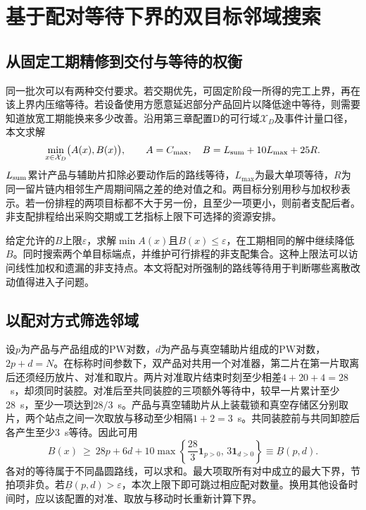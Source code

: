 \section{基于配对等待下界的双目标邻域搜索}\label{sec:third-innovation}

\subsection{从固定工期精修到交付与等待的权衡}

同一批次可以有两种交付要求。若交期优先，可固定阶段一所得的完工上界，再在该上界内压缩等待。若设备使用方愿意延迟部分产品回片以降低途中等待，则需要知道放宽工期能换来多少改善。沿用第三章配置D的可行域$\mathcal X_D$及事件计量口径，本文求解
\begin{equation}
 \min_{x\in\mathcal X_D}\bigl(A(x),B(x)\bigr),\qquad
 A=C_{\max},\quad B=L_{\rm sum}+10L_{\max}+25R .
 \label{eq:pareto-ab}
\end{equation}
$L_{\rm sum}$累计产品与辅助片扣除必要动作后的路线等待，$L_{\max}$为最大单项等待，$R$为同一留片链内相邻生产周期间隔之差的绝对值之和。两目标分别用秒与加权秒表示。若一份排程的两项目标都不大于另一份，且至少一项更小，则前者支配后者。非支配排程给出采购交期或工艺指标上限下可选择的资源安排。\par

给定允许的$B$上限$\varepsilon$，求解$\min A(x)$且$B(x)\le\varepsilon$，在工期相同的解中继续降低$B$。同时搜索两个单目标端点，并维护可行排程的非支配集合。这种上限法可以访问线性加权和遗漏的非支持点\citep{mavrotas2009}。本文将配对所强制的路线等待用于判断哪些离散改动值得进入子问题。

\subsection{以配对方式筛选邻域}

设$p$为产品与产品组成的PW对数，$d$为产品与真空辅助片组成的PW对数，$2p+d=N$。在标称时间参数下，双产品对共用一个对准器，第二片在第一片取离后还须经历放片、对准和取片。两片对准取片结束时刻至少相差$4+20+4=28$~s，却须同时装腔。对准后至共同装腔的三项额外等待中，较早一片累计至少28~s，至少一项达到$28/3$~s。产品与真空辅助片从上装载锁和真空存储区分别取片，两个站点之间一次取放与移动至少相隔$1+2=3$~s。共同装腔前与共同卸腔后各产生至少3~s等待。因此可用
\begin{equation}
 B(x)\ \ge\ 28p+6d+
 10\max\!\left\{\frac{28}{3}\mathbf{1}_{p>0},\,3\mathbf{1}_{d>0}\right\}
 \equiv \underline B(p,d).
 \label{eq:pareto-pair-bound}
\end{equation}
各对的等待属于不同晶圆路线，可以求和。最大项取所有对中成立的最大下界，节拍项非负。若$\underline B(p,d)>\varepsilon$，本次上限下即可跳过相应配对数量。换用其他设备时间时，应以该配置的对准、取放与移动时长重新计算下界。

